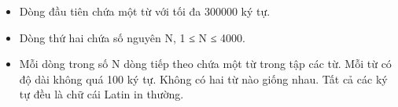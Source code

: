 \begin{itemize}
	\item     Dòng đầu tiên chứa một từ với tối đa 300000 ký tự.   
	\item     Dòng thứ hai chứa số nguyên N, 1 ≤ N ≤ 4000.   
	\item     Mỗi dòng trong số N dòng tiếp theo chứa một từ trong tập các từ. Mỗi từ có độ dài không quá 100 ký tự. Không có hai từ nào giống nhau. Tất cả   các ký tự đều là chữ cái Latin in thường.   
\end{itemize}

\